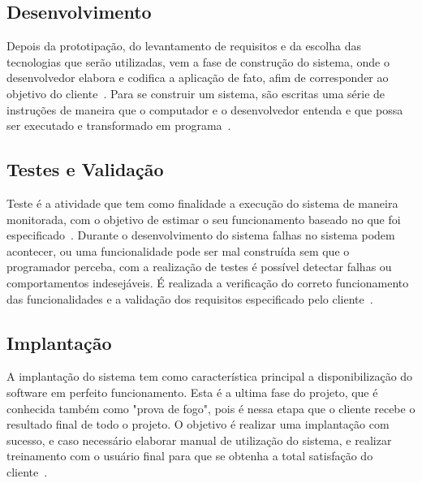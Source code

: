 \subsection{Desenvolvimento}
\indent

Depois da prototipação, do levantamento de requisitos e da escolha das tecnologias que serão utilizadas, vem a fase de construção do sistema, onde o desenvolvedor elabora e codifica a aplicação de fato, afim de corresponder ao objetivo do cliente~\citep{pressman2016engenharia}. 
Para se construir um sistema, são escritas uma série de instruções de maneira que o computador e o desenvolvedor entenda e que possa ser executado e transformado em programa~\citep{ascencio2008fundamentos}.

\subsection{Testes e Validação}
\indent

Teste é a atividade que tem como finalidade a execução do sistema de maneira monitorada, com o objetivo de estimar o seu funcionamento baseado no que foi especificado~\citep{rios2006teste}.
Durante o desenvolvimento do sistema falhas no sistema podem acontecer, ou uma funcionalidade pode ser mal construída sem que o programador perceba, com a realização de testes é possível detectar falhas ou comportamentos indesejáveis. 
É realizada a verificação do correto funcionamento das funcionalidades e a validação dos requisitos especificado pelo cliente~\citep{costa2006estrategia}.


\subsection{Implantação}
\indent

A implantação do sistema tem como característica principal a disponibilização do software em perfeito funcionamento. 
Esta é a ultima fase do projeto, que é conhecida também como "prova de fogo", pois é nessa etapa que o cliente recebe o resultado final de todo o projeto. O objetivo é realizar uma implantação com sucesso, e caso necessário elaborar manual de utilização do sistema, e realizar treinamento com o usuário final para que se obtenha a total satisfação do cliente~\citep{rezende2006engenharia}.
